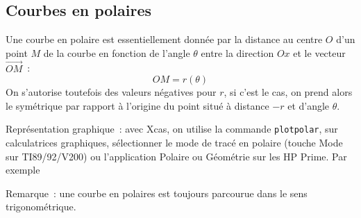 \documentclass[a4paper,11pt]{book}
\begin{document}
\begin{giacjshere}
\section{Courbes en polaires}
Une courbe en polaire est essentiellement
donn\'ee par la distance au centre $O$ d'un
point $M$ de la courbe en fonction de l'angle $\theta$ 
entre la direction $Ox$ et le vecteur $\overrightarrow{OM}$~:
$$ OM = r(\theta)$$ 
On s'autorise toutefois des valeurs n\'egatives pour $r$,
si c'est le cas, on prend alors le sym\'etrique par rapport
\`a l'origine du point situ\'e \`a distance $-r$ et d'angle $\theta$.

Repr\'esentation graphique~: avec Xcas, on utilise
la commande \verb|plotpolar|, sur calculatrices
graphiques, s\'electionner le mode de trac\'e en polaire (touche Mode
sur TI89/92/V200) ou
l'application Polaire ou G\'eom\'etrie sur les HP Prime.
Par exemple 





Remarque~: une courbe en polaires est toujours parcourue dans le sens
trigonom\'etrique.


\end{giacjshere}
\end{document}
